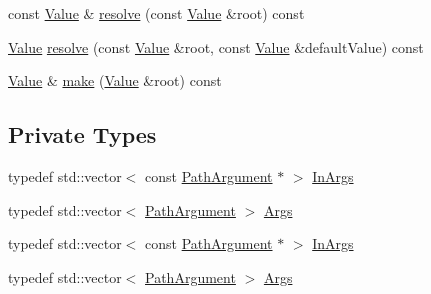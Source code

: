 \begin{DoxyCompactItemize}
\item 
const \hyperlink{class_json_1_1_value}{Value} \& \hyperlink{class_json_1_1_path_a3008d26b00e4322cd56dfc5d84ef2cfa}{resolve} (const \hyperlink{class_json_1_1_value}{Value} \&root) const
\item 
\hyperlink{class_json_1_1_value}{Value} \hyperlink{class_json_1_1_path_ab65ab001ccdbc6f8b5f123da58b92539}{resolve} (const \hyperlink{class_json_1_1_value}{Value} \&root, const \hyperlink{class_json_1_1_value}{Value} \&default\+Value) const
\item 
\hyperlink{class_json_1_1_value}{Value} \& \hyperlink{class_json_1_1_path_ad32b95567b035727b39e0a3b0a675d3f}{make} (\hyperlink{class_json_1_1_value}{Value} \&root) const
\end{DoxyCompactItemize}
\subsection*{Private Types}
\begin{DoxyCompactItemize}
\item 
typedef std\+::vector$<$ const \hyperlink{class_json_1_1_path_argument}{Path\+Argument} $\ast$ $>$ \hyperlink{class_json_1_1_path_ab29d7b2fc896c7d3c5ed4609af3a3f23}{In\+Args}
\item 
typedef std\+::vector$<$ \hyperlink{class_json_1_1_path_argument}{Path\+Argument} $>$ \hyperlink{class_json_1_1_path_a27d96232d034d7a78286468676f9cb3e}{Args}
\item 
typedef std\+::vector$<$ const \hyperlink{class_json_1_1_path_argument}{Path\+Argument} $\ast$ $>$ \hyperlink{class_json_1_1_path_ab29d7b2fc896c7d3c5ed4609af3a3f23}{In\+Args}
\item 
typedef std\+::vector$<$ \hyperlink{class_json_1_1_path_argument}{Path\+Argument} $>$ \hyperlink{class_json_1_1_path_a27d96232d034d7a78286468676f9cb3e}{Args}
\end{DoxyCompactItemize}
